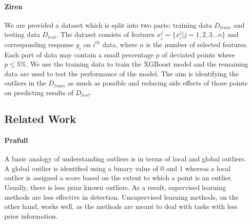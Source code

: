 \documentclass[runningheads]{llncs}
\begin{document}

\paragraph{Ziren}We are provided a dataset which is split into two parts: training data $D_{train}$ and testing data $D_{test}$. The dataset consists of features $x_i^j = \{x_i^j | j = 1,2,3...n\}$ and corresponding response $y_i$ on $i^{th}$ data, where $n$ is the number of selected features. Each part of data may contain a small percentage $p$ of deviated points where $p \leq 5\%$. We use the training data to train the XGBoost model and the remaining data are used to test the performance of the model. The aim is identifying the outliers in the $D_{train}$ as much as possible and reducing side effects of those points on predicting results of $D_{test}$.

\subsection{Related Work}


\paragraph{Prafull} A basic analogy of understanding outliers is in terms of local and global outliers. A global outlier is identified using a binary value of 0 and 1 whereas a local outlier is assigned a score based on the extent to which a point is an outlier. Usually, there is less prior known outliers. As a result, supervised learning methods are less effective in detection. Unsupervised learning methods, on the other hand, works well, as the methods are meant to deal with tasks with less prior information.
\end{document}
